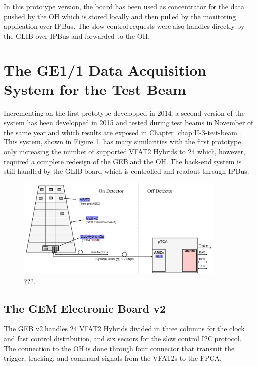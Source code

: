        In this prototype version, the board has been used as concentrator for the data pushed by the OH which is stored locally and then pulled by the monitoring application over IPBus. The slow control requests were also handles directly by the GLIB over IPBus and forwarded to the OH.

  \section{The GE1/1 Data Acquisition System for the Test Beam}

    Incrementing on the first prototype developped in 2014, a second version of the system has been developped in 2015 and tested during test beams in November of the same year and which results are exposed in Chapter \ref{chap:II-3-test-beam}. This system, shown in Figure \ref{fig:II-2-daq-gem-system-v2a}, has many similarities with the first prototype, only increasing the number of supported VFAT2 Hybrids to 24 which, however, required a complete redesign of the GEB and the OH. The back-end system is still handled by the GLIB board which is controlled and readout through IPBus.

    \begin{figure}[h!]
      \centering
      \includegraphics[width=0.9\textwidth]{img/II-2-daq/gem-system-v2a.pdf}
      \caption{???.}
      \label{fig:II-2-daq-gem-system-v2a}
    \end{figure}

    \subsection{The GEM Electronic Board v2}

      The GEB v2 handles 24 VFAT2 Hybrids divided in three columns for the clock and fast control distribution, and six sectors for the slow control I2C protocol. The connection to the OH is done through four connector that transmit the trigger, tracking, and command signals from the VFAT2s to the FPGA.

